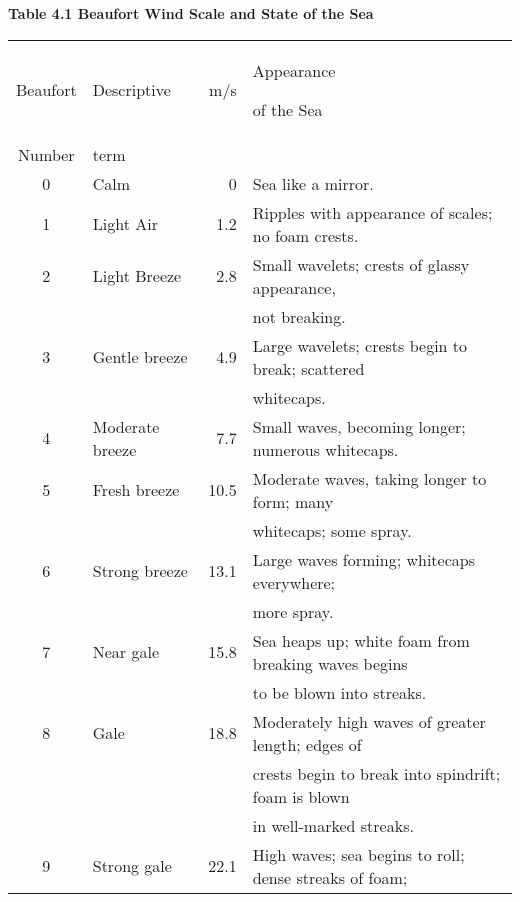 \begin{table}[t!] {\textbf{\footnotesize{Table 4.1 Beaufort Wind Scale and State of the Sea}}}
\\[1ex]
\begin{footnotesize}
\begin{tabular}{@{}clrp{70mm}@{}} \hline
Beaufort    & Descriptive & m/s & Appearance \rule{0ex}{2.5ex}of the Sea \\
Number & term \  &  & \\[0.5ex]
\hline  %
0 & Calm \rule{0ex}{2.5ex}  &   0 & Sea like a mirror. \\
1 & Light Air&  1.2 &   Ripples with appearance of scales; no foam crests.\\
2 & Light Breeze &  2.8 &   Small wavelets; crests of glassy appearance, \\
\ &\ &\ & \hspace{1em}not breaking. \\
3 & Gentle breeze&  4.9 &   Large wavelets; crests begin to break; scattered\\
\ &\ &\ & \hspace{1em}whitecaps.\\
4 & Moderate breeze & 7.7 & Small waves, becoming longer; numerous whitecaps. \\
5 & Fresh breeze &  10.5 &  Moderate waves, taking longer to form; many\\
\ &\ &\ & \hspace{1em}whitecaps; some spray. \\
6 & Strong breeze & 13.1 &  Large waves forming; whitecaps everywhere; \\
\ &\ &\ &\hspace{1em}more spray. \\
7 & Near gale & 15.8 &  Sea heaps up; white foam from breaking waves begins\\
\ &\ &\ & \hspace{1em}to be blown into streaks.\\
8 & Gale &      18.8  & Moderately high waves of greater length; edges of \\
\ &\ &\ & \hspace{1em}crests begin to break into spindrift; foam is blown \\
\ &\ &\ & \hspace{1em}in well-marked streaks.\\
9 & Strong gale &   22.1  & High waves; sea begins to roll; dense streaks of foam;

\end{tabular}
\end{footnotesize}
\end{table}
